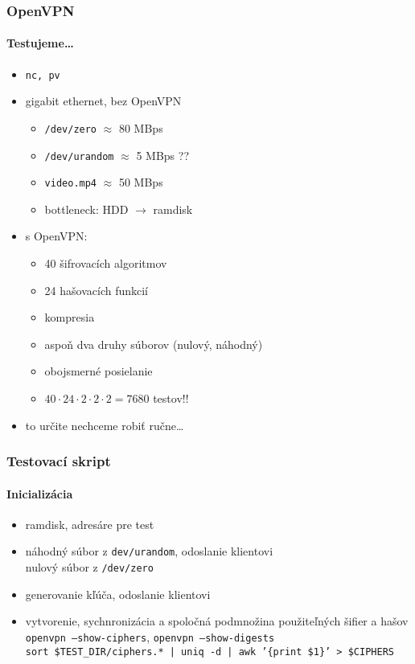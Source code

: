 \documentclass{beamer}
\begin{document}
\begin{frame}
	\frametitle{OpenVPN}
	\framesubtitle{Testujeme\dots}
	\begin{itemize}
		\item \texttt{nc, pv}
		\item gigabit ethernet, bez OpenVPN
			\begin{itemize}
				\item \texttt{/dev/zero} $\approx$ 80 MBps
				\item \texttt{/dev/urandom} $\approx$ 5 MBps ??
				\item \texttt{video.mp4} $\approx$ 50 MBps
				\item bottleneck: HDD $\rightarrow$ ramdisk
			\end{itemize}
		\bigskip
		\item s OpenVPN:
			\begin{itemize}
				\item 40 šifrovacích algoritmov
				\item 24 hašovacích funkcií
				\item kompresia
				\item aspoň dva druhy súborov (nulový, náhodný)
				\item obojsmerné posielanie
				\item $40 \cdot 24 \cdot 2 \cdot 2 \cdot 2 = 7680$ testov!!
			\end{itemize}
		\item to určite nechceme robiť ručne\dots
	\end{itemize}
\end{frame}

\begin{frame}
	\frametitle{Testovací skript}
	\framesubtitle{Inicializácia}
	\begin{itemize}
		\item ramdisk, adresáre pre test
		\item náhodný súbor z \texttt{dev/urandom}, odoslanie klientovi\\
			 nulový súbor z \texttt{/dev/zero}
		\item generovanie kľúča, odoslanie klientovi
		\item vytvorenie, sychnronizácia a spoločná podmnožina použiteľných šifier a hašov\\
			\bigskip
			{\small
			\texttt{openvpn --show-ciphers}, \texttt{openvpn --show-digests}\\
			\texttt{sort \$TEST\_DIR/ciphers.* | uniq -d | awk '\{print \$1\}' > \$CIPHERS}}
	\end{itemize}
\end{frame}
\end{document}
